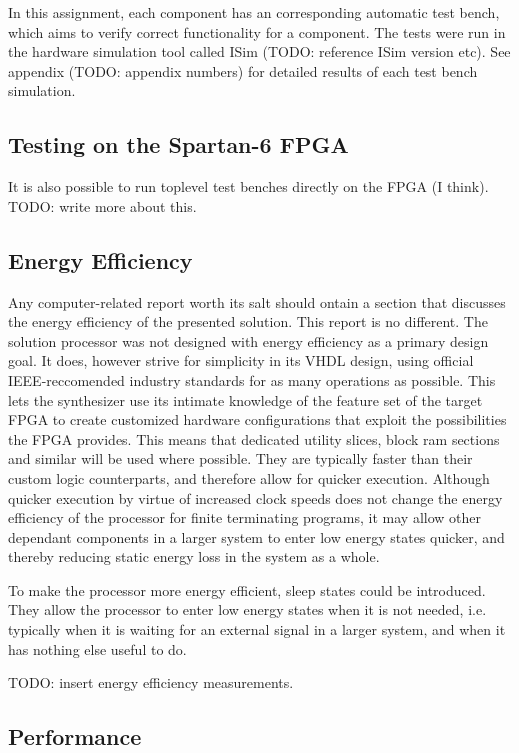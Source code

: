 In this assignment, each component has an corresponding automatic test bench, which aims to verify correct functionality for a component.
The tests were run in the hardware simulation tool called ISim (TODO: reference ISim version etc).
See appendix (TODO: appendix numbers) for detailed results of each test bench simulation.

\subsection{Testing on the Spartan-6 FPGA}

It is also possible to run toplevel test benches directly on the FPGA (I think).
TODO: write more about this.

\subsection{Energy Efficiency}

Any computer-related report worth its salt should ontain a section that discusses the energy efficiency of the presented solution.
This report is no different.
The solution processor was not designed with energy efficiency as a primary design goal.
It does, however strive for simplicity in its VHDL design, using official IEEE-reccomended industry standards for as many operations as possible.
This lets the synthesizer use its intimate knowledge of the feature set of the target FPGA to create customized hardware configurations that exploit the possibilities the FPGA provides.
This means that dedicated utility slices, block ram sections and similar will be used where possible.
They are typically faster than their custom logic counterparts, and therefore allow for quicker execution.
Although quicker execution by virtue of increased clock speeds does not change the energy efficiency of the processor for finite terminating programs, it may allow other dependant components in a larger system to enter low energy states quicker, and thereby reducing static energy loss in the system as a whole.

To make the processor more energy efficient, sleep states could be introduced.
They allow the processor to enter low energy states when it is not needed, i.e. typically when it is waiting for an external signal in a larger system, and when it has nothing else useful to do.

TODO: insert energy efficiency measurements.

\subsection{Performance}

